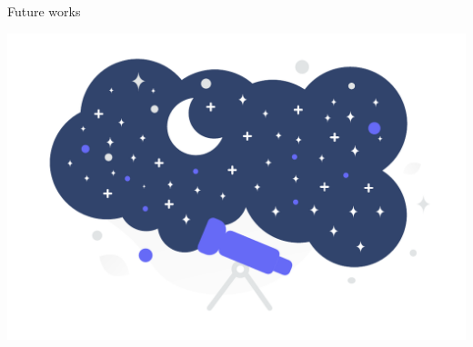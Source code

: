 \begin{frame}{Future works}
  \begin{backgroundblock} 
    \includegraphics[width=\paperwidth]{img/conclusion} 
  \end{backgroundblock} 
  \begin{card}

  \end{card}
  \begin{card}

  \end{card}

\end{frame}